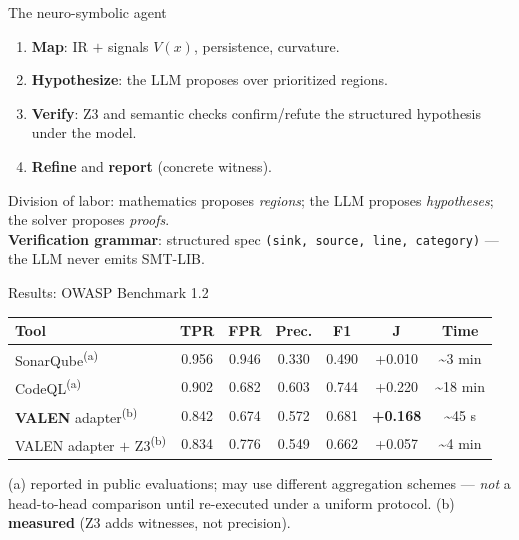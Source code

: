 \documentclass[aspectratio=169,11pt]{beamer}
\begin{document}
\begin{frame}[fragile]{The neuro-symbolic agent}
  \begin{enumerate}
    \item \textbf{Map}: IR $+$ signals $V(x)$, persistence, curvature.
    \item \textbf{Hypothesize}: the LLM proposes over prioritized regions.
    \item \textbf{Verify}: Z3 and semantic checks confirm/refute the structured hypothesis under the model.
    \item \textbf{Refine} and \textbf{report} (concrete witness).
  \end{enumerate}
  \vspace{2mm}
  Division of labor: mathematics proposes \emph{regions}; the LLM proposes
  \emph{hypotheses}; the solver proposes \emph{proofs}. \\[1mm]
  \textbf{Verification grammar}: structured spec
  \texttt{(sink, source, line, category)} --- the LLM never emits SMT-LIB.
\end{frame}

\begin{frame}{Results: OWASP Benchmark 1.2}
  \begin{center}
  \small
  \begin{tabular}{lcccccc}
  \toprule
  \textbf{Tool} & \textbf{TPR} & \textbf{FPR} & \textbf{Prec.} & \textbf{F1} & \textbf{J} & \textbf{Time} \\
  \midrule
  SonarQube\textsuperscript{(a)} & 0.956 & 0.946 & 0.330 & 0.490 & +0.010 & \textasciitilde3 min \\
  CodeQL\textsuperscript{(a)} & 0.902 & 0.682 & 0.603 & 0.744 & +0.220 & \textasciitilde18 min \\
  \textbf{VALEN} adapter\textsuperscript{(b)} & 0.842 & 0.674 & 0.572 & 0.681 & \textbf{+0.168} & \textasciitilde45 s \\
  VALEN adapter $+$ Z3\textsuperscript{(b)} & 0.834 & 0.776 & 0.549 & 0.662 & +0.057 & \textasciitilde4 min \\
  \bottomrule
  \end{tabular}
  \end{center}

  \vspace{1mm}
  {\footnotesize (a) reported in public evaluations; may use different aggregation
  schemes --- \emph{not} a head-to-head comparison until re-executed under a uniform
  protocol. (b) \textbf{measured} (Z3 adds witnesses, not precision).}
\end{frame}
\end{document}
